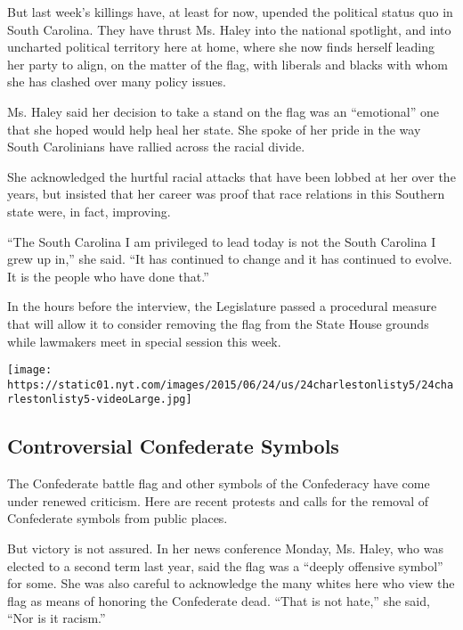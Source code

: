 But last week's killings have, at least for now, upended the political
status quo in South Carolina. They have thrust Ms. Haley into the
national spotlight, and into uncharted political territory here at home,
where she now finds herself leading her party to align, on the matter of
the flag, with liberals and blacks with whom she has clashed over many
policy issues.

Ms. Haley said her decision to take a stand on the flag was an
``emotional'' one that she hoped would help heal her state. She spoke of
her pride in the way South Carolinians have rallied across the racial
divide.

She acknowledged the hurtful racial attacks that have been lobbed at her
over the years, but insisted that her career was proof that race
relations in this Southern state were, in fact, improving.

``The South Carolina I am privileged to lead today is not the South
Carolina I grew up in,'' she said. ``It has continued to change and it
has continued to evolve. It is the people who have done that.''

In the hours before the interview, the Legislature passed a procedural
measure that will allow it to consider removing the flag from the State
House grounds while lawmakers meet in special session this week.

\href{https://www.nytimes.com/interactive/2015/06/23/us/Calls-to-Cut-Ties-to-Symbols-of-the-South.html}{}

\texttt{[image: https://static01.nyt.com/images/2015/06/24/us/24charlestonlisty5/24charlestonlisty5-videoLarge.jpg]}

\hypertarget{controversial-confederate-symbols}{%
\subsection{Controversial Confederate
Symbols}\label{controversial-confederate-symbols}}

The Confederate battle flag and other symbols of the Confederacy have
come under renewed criticism. Here are recent protests and calls for the
removal of Confederate symbols from public places.

But victory is not assured. In her news conference Monday, Ms. Haley,
who was elected to a second term last year, said the flag was a ``deeply
offensive symbol'' for some. She was also careful to acknowledge the
many whites here who view the flag as means of honoring the Confederate
dead. ``That is not hate,'' she said, ``Nor is it racism.''


